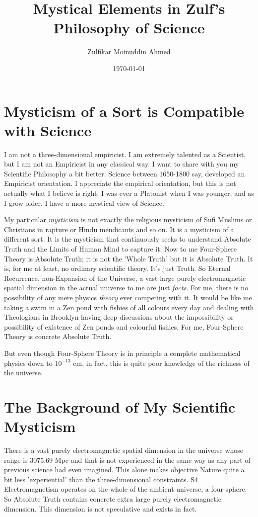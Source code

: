 \documentclass{amsart}
\title{Mystical Elements in Zulf's Philosophy of Science}
\author{Zulfikar Moinuddin Ahmed}
\date{\today}
\begin{document}
\maketitle

\section{Mysticism of a Sort is Compatible with Science}

I am not a three-dimensional empiricist.  I am extremely talented as a Scientist, but I am not an Empiricist in any classical way.  I want to share with you my Scientific Philosophy a bit better.  Science between 1650-1800 say, developed an Empiricist orientation.  I appreciate the empirical orientation, but this is not actually what I believe is right.  I was ever a Platonist when I was younger, and as I grow older, I have a more mystical view of Science.

My particular {\em mysticism} is not exactly the religious mysticism of Sufi Muslims or Christians in rapture or Hindu mendicants and so on.  It is a mysticism of a different sort.  It is the mysticism that continuously seeks to understand Absolute Truth and the Limits of Human Mind to capture it.  Now to me Four-Sphere Theory is Absolute Truth; it is not the 'Whole Truth' but it is Absolute Truth.  It is, for me at least, no ordinary scientific theory.  It's just Truth.  So Eternal Recurrence, non-Expansion of the Universe, a vast large purely electromagnetic spatial dimension in the actual universe to me are just {\em facts}.  For me, there is no possibility of any mere physics {\em theory} ever competing with it.  It would be like me taking a swim in a Zen pond with fishies of all colours every day and dealing with Theologians in Brooklyn having deep discussions about the impossibility or possibility of existence of Zen ponds and colourful fishies.  For me, Four-Sphere Theory is concrete Absolute Truth.

But even though Four-Sphere Theory is in principle a complete mathematical physics down to $10^{-13}$ cm, in fact, this is quite poor knowledge of the richness of the universe.  

\section{The Background of My Scientific Mysticism}

There is a vast purely electromagnetic spatial dimension in the universe whose range is 3075.69 Mpc and that is not experienced in the same way as any part of previous science had even imagined.  This alone makes objective Nature quite a bit less 'experiential' than the three-dimensional constraints.  S4 Electromagnetism operates on the whole of the ambient universe, a four-sphere.  So Absolute Truth contains concrete extra large purely electromagnetic dimension.  This dimension is not speculative and exists in fact.  
\end{document}
